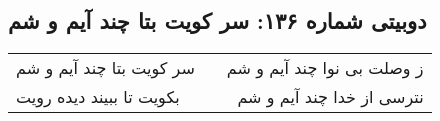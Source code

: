 \begin{center}
\section*{دوبیتی شماره ۱۳۶: سر کویت بتا چند آیم و شم}
\label{sec:136}
\begin{longtable}{l p{0.5cm} r}
سر کویت بتا چند آیم و شم
&&
ز وصلت بی نوا چند آیم و شم
\\
بکویت تا ببیند دیده رویت
&&
نترسی از خدا چند آیم و شم
\\
\end{longtable}
\end{center}
